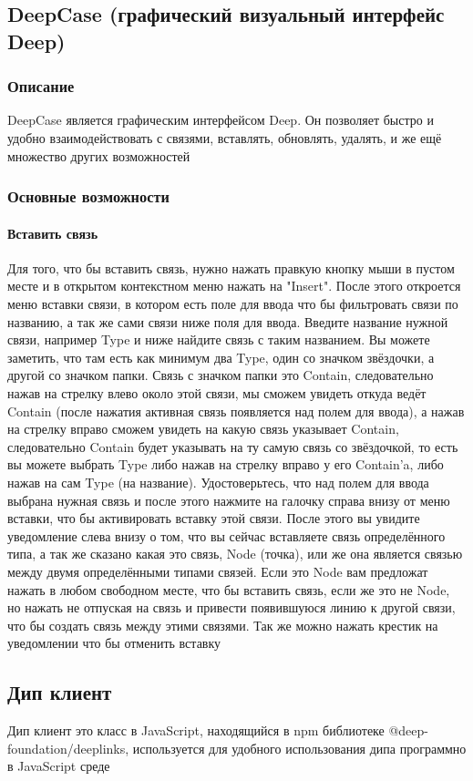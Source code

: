 \documentclass{article}
\begin{document}
\subsection{DeepCase (графический визуальный интерфейс Deep)}
\subsubsection{Описание}
DeepCase является графическим интерфейсом Deep. Он позволяет быстро и удобно взаимодействовать с связями, вставлять, обновлять, удалять, и же ещё множество других возможностей
\subsubsection{Основные возможности}
\paragraph{Вставить связь}
Для того, что бы вставить связь, нужно нажать правкую кнопку мыши в пустом месте и в открытом контекстном меню нажать на "Insert". После этого откроется меню вставки связи, в котором есть поле для ввода что бы фильтровать связи по названию, а так же сами связи ниже поля для ввода. Введите название нужной связи, например Type и ниже найдите связь с таким названием. Вы можете заметить, что там есть как минимум два Type, один со значком звёздочки, а другой со значком папки. Связь с значком папки это Contain, следовательно нажав на стрелку влево около этой связи, мы сможем увидеть откуда ведёт Contain (после нажатия активная связь появляется над полем для ввода), а нажав на стрелку вправо сможем увидеть на какую связь указывает Contain, следовательно Contain будет указывать на ту самую связь со звёздочкой, то есть вы можете выбрать Type либо нажав на стрелку вправо у его Contain'a, либо нажав на сам Type (на название). Удостоверьтесь, что над полем для ввода выбрана нужная связь и после этого нажмите на галочку справа внизу от меню вставки, что бы активировать вставку этой связи. После этого вы увидите уведомление слева внизу о том, что вы сейчас вставляете связь определённого типа, а так же сказано какая это связь, Node (точка), или же она является связью между двумя определёнными типами связей. Если это Node вам предложат нажать в любом свободном месте, что бы вставить связь, если же это не Node, но нажать не отпуская на связь и привести появившуюся линию к другой связи, что бы создать связь между этими связями. Так же можно нажать крестик на уведомлении что бы отменить вставку
\subsection{Дип клиент}
Дип клиент это класс в JavaScript, находящийся в npm библиотеке @deep-foundation/deeplinks, используется для удобного использования дипа программно в JavaScript среде
\end{document}
